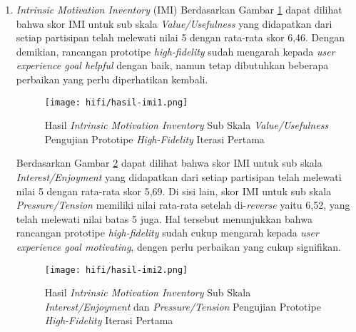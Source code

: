 \begin{enumerate}
  \item \textit{Intrinsic Motivation Inventory} (IMI)
  \subitem  Berdasarkan Gambar \ref{img:imi1_1} dapat dilihat bahwa skor IMI untuk sub skala \textit{Value/Usefulness} yang didapatkan dari setiap partisipan telah melewati nilai 5 dengan rata-rata skor 6,46. Dengan demikian, rancangan prototipe \textit{high-fidelity} sudah mengarah kepada \textit{user experience goal helpful} dengan baik, namun tetap dibutuhkan beberapa perbaikan yang perlu diperhatikan kembali.
  
  \begin{figure}[h]
    \centering
    \texttt{[image: hifi/hasil-imi1.png]}
    \caption{Hasil \textit{Intrinsic Motivation Inventory} Sub Skala \textit{Value/Usefulness} Pengujian Prototipe \textit{High-Fidelity} Iterasi Pertama}
    \label{img:imi1_1}
  \end{figure}
  \FloatBarrier
  
  \subitem  Berdasarkan Gambar \ref{img:imi2_1} dapat dilihat bahwa skor IMI untuk sub skala \textit{Interest/Enjoyment} yang didapatkan dari setiap partisipan telah melewati nilai 5 dengan rata-rata skor 5,69. Di sisi lain, skor IMI untuk sub skala \textit{Pressure/Tension} memiliki nilai rata-rata setelah di-\textit{reverse} yaitu 6,52, yang telah melewati nilai batas 5 juga. Hal tersebut menunjukkan bahwa rancangan prototipe \textit{high-fidelity} sudah cukup mengarah kepada \textit{user experience goal motivating}, dengen perlu perbaikan yang cukup signifikan.

  \begin{figure}[h]
    \centering
    \texttt{[image: hifi/hasil-imi2.png]}
    \caption{Hasil \textit{Intrinsic Motivation Inventory} Sub Skala \textit{Interest/Enjoyment} dan \textit{Pressure/Tension} Pengujian Prototipe \textit{High-Fidelity} Iterasi Pertama}
    \label{img:imi2_1}
  \end{figure}
  \FloatBarrier

\end{enumerate}




